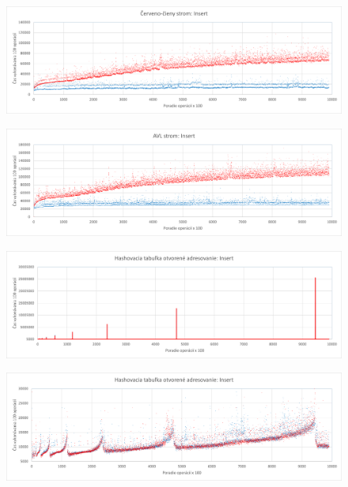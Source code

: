 \documentclass[a4paper,slovak,12pt]{article}
\begin{document}
    \begin{figure}[!htbp]
        \centering
        \label{fig:figure1}
        \includegraphics[width=\textwidth]{RB_Insert}
    \end{figure}
    \begin{figure}[!htbp]
        \centering
        \label{fig:figure2}
        \includegraphics[width=\textwidth]{AVL_Insert}
    \end{figure}
    \begin{figure}[!htbp]
        \centering
        \label{fig:figure3}
        \includegraphics[width=\textwidth]{HashRobin_Insert}
    \end{figure}
    \begin{figure}[!htbp]
        \centering
        \label{fig:figure4}
        \includegraphics[width=\textwidth]{HashRobin_Insert_zoomed}
    \end{figure}
\end{document}
